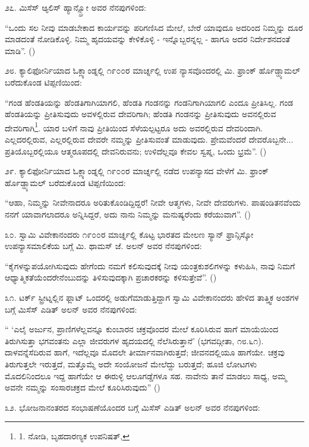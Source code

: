 ೨೭. ಮಿಸೆಸ್ ಆ್ಯಲಿಸ್ ಹ್ಯಾನ್ಸ್ಬ್ರೋ ಅವರ ನೆನಪುಗಳಿಂದ:

“ಒಂದು ಸಲ ನೀವು ಮಾಡಬೇಕಾದ ಕಾರ್ಯವನ್ನು ಪರಿಗಣಿಸಿದ ಮೇಲೆ, ಬೇರೆ ಯಾವುದೂ ಅದರಿಂದ ನಿಮ್ಮನ್ನು ದೂರ ಮಾಡದಂತೆ ನೋಡಿಕೊಳ್ಳಿ. ನಿಮ್ಮ ಹೃದಯವನ್ನು ಕೇಳಿಕೊಳ್ಳಿ - ಇನ್ನೊಬ್ಬರನ್ನಲ್ಲ - ಹಾಗೂ ಅದರ ನಿರ್ದೇಶನದಂತೆ ಮಾಡಿ”. ()

೨೮. ಕ್ಯಾಲಿಫೋರ್ನಿಯಾದ ಓಕ್ಲ್ಯಾಂಡ್ನಲ್ಲಿ ೧೯೦೦ರ ಮಾರ್ಚ್ನಲ್ಲಿ ಉಪ ನ್ಯಾಸವೊಂದರಲ್ಲಿ ಮಿ. ಫ್ರಾಂಕ್ ರ್ಹೊಡ್ಹ್ಯಾಮಲ್ ಬರೆದುಕೊಂಡ ಟಿಪ್ಪಣಿಯಿಂದ:

“ಗಂಡ ಹೆಂಡತಿಯನ್ನು ಹೆಂಡತಿಗಾಗಿಯಾಗಲಿ, ಹೆಂಡತಿ ಗಂಡನನ್ನು ಗಂಡನಿಗಾಗಿಯಾಗಲಿ ಎಂದೂ ಪ್ರೀತಿಸಿಲ್ಲ. ಗಂಡ ಹೆಂಡತಿಯನ್ನು ಪ್ರೀತಿಸುವುದು ಅವಳಲ್ಲಿರುವ ದೇವರಿಗಾಗಿ; ಹೆಂಡತಿ ಗಂಡನನ್ನು ಪ್ರೀತಿಸುವುದು ಅವನಲ್ಲಿರುವ ದೇವರಿಗಾಗಿ\footnote{1. ನೋಡಿ, ಬೃಹದಾರಣ್ಯಕ ಉಪನಿಷತ್, }. ಯಾರ ಬಳಿಗೆ ನಾವು ಪ್ರೀತಿಯಿಂದ ಸೆಳೆಯಲ್ಪಟ್ಟರೂ ಅದು ಅವರಲ್ಲಿರುವ ದೇವರಿಂದಾಗಿ. ಎಲ್ಲದರಲ್ಲಿರುವ, ಎಲ್ಲರಲ್ಲಿರುವ ದೇವರೇ ನಮ್ಮನ್ನು ಪ್ರೀತಿಸುವಂತೆ ಮಾಡುವುದು. ಪ್ರೇಮವೆಂದರೆ ದೇವರೊಬ್ಬನೇ... ಪ್ರತಿಯೊಬ್ಬರಲ್ಲಿಯೂ ಆತ್ಮರೂಪದಲ್ಲಿ ದೇವನಿರುವನು; ಉಳಿದೆಲ್ಲವೂ ಕೇವಲ ಸ್ವಪ್ನ, ಒಂದು ಭ್ರಮೆ”. ()

೨೯. ಕ್ಯಾಲಿಫೋರ್ನಿಯಾದ ಓಕ್ಲ್ಯಾಂಡ್ನಲ್ಲಿ ೧೯೦೦ರ ಮಾರ್ಚ್ನಲ್ಲಿ ನಡೆದ ಉಪನ್ಯಾಸದ ವೇಳೆಗೆ ಮಿ. ಫ್ರಾಂಕ್ ರ್ಹೊಡ್ಹ್ಯಾಮಲ್ ಬರೆದುಕೊಂಡ ಟಿಪ್ಪಣಿಯಿಂದ:

“ಆಹಾ, ನಿಮ್ಮನ್ನು ನೀವೇನಾದರೂ ಅರಿತುಕೊಂಡಿದ್ದಿದ್ದರೆ! ನೀವೇ ಆತ್ಮಗಳು, ನೀವೇ ದೇವರುಗಳು. ಪಾಷಂಡಿತನವೆಂದು ನನಗೆ ಯಾವಾಗಲಾದರೂ ಅನ್ನಿಸಿದ್ದರೆ, ಅದು ನಾನು ನಿಮ್ಮನ್ನು ಮನುಷ್ಯರೆಂದು ಕರೆಯುವಾಗ”. ()

೩೦. ಸ್ವಾಮಿ ವಿವೇಕಾನಂದರು ೧೯೦೦ರ ಮಾರ್ಚ್ನಲ್ಲಿ ಕೊಟ್ಟ ಭಾರತದ ಮೇಲಣ ಸ್ಯಾನ್ ಫ್ರಾನ್ಸಿಸ್ಕೋ ಉಪನ್ಯಾಸಮಾಲಿಕೆಯ ಬಗ್ಗೆ ಮಿ. ಥಾಮಸ್ ಜೆ. ಅಲನ್ ಅವರ ನೆನಪುಗಳಿಂದ:

“ಕೈಗಳನ್ನುಪಯೋಗಿಸುವುದು ಹೇಗೆಂದು ನಮಗೆ ಕಲಿಸುವುದಕ್ಕೆ ನೀವು ಯಂತ್ರಕುಶಲಿಗಳನ್ನು ಕಳುಹಿಸಿ, ನಾವು ನಿಮಗೆ ಆಧ್ಯಾತ್ಮಿಕತೆಯೆಂದರೇನೆಂಬುದನ್ನು ತಿಳಿಸುವುದಕ್ಕಾಗಿ ಪ್ರಚಾರಕರನ್ನು ಕಳಿಸುತ್ತೇವೆ”. ()

೩೧. ಟರ್ಕ್ ಸ್ಟ್ರೀಟ್ನಲ್ಲಿನ ಫ್ಲಾಟ್ ಒಂದರಲ್ಲಿ ಅಡುಗೆಮಾಡುತ್ತಿದ್ದಾಗ ಸ್ವಾಮಿ ವಿವೇಕಾನಂದರು ಹೇಳಿದ ತಾತ್ತ್ವಿಕ ಅಂಶಗಳ ಬಗ್ಗೆ ಮಿಸೆಸ್ ಎಡಿತ್ ಅಲನ್ ಅವರ ನೆನಪುಗಳಿಂದ:

“ ‘ಎಲೈ ಅರ್ಜುನ, ಪ್ರಾಣಿಗಳೆಲ್ಲವನ್ನೂ ಕುಂಬಾರನ ಚಕ್ರವೊಂದರ ಮೇಲೆ ಕೂರಿಸಿರುವ ಹಾಗೆ ಮಾಯೆಯಿಂದ ತಿರುಗಿಸುತ್ತಾ ಭಗವಂತನು ಎಲ್ಲಾ ಜೀವರುಗಳ ಹೃದಯದಲ್ಲಿ ನೆಲೆಸಿರುತ್ತಾನೆ’ (ಭಗವದ್ಗೀತಾ, ೧೮.೬೧). ದಾಳವನ್ನೆಸೆದಿರುವ ಹಾಗೆ, ಇದೆಲ್ಲವೂ ಮೊದಲೇ ತೀರ್ಮಾನವಾಗಿರುತ್ತದೆ; ಜೀವನದಲ್ಲಿಯೂ ಹಾಗೆಯೇ. ಚಕ್ರವು ತಿರುಗುತ್ತಲೇ ಇರುತ್ತದೆ, ಮತ್ತೊಮ್ಮೆ ಅದೇ ಸಂಯೋಜನೆ ಮೇಲೆದ್ದು ಬರುತ್ತದೆ; ಹೂಜಿ ಲೋಟಗಳು ಮೊದಲಿನಿಂದಲೂ ಇದ್ದ ಹಾಗೆಯೇ ಆ ಈರುಳ್ಳಿ ಆಲೂಗಡ್ಡೆಗಳೂ ಸಹ. ನಾವೇನು ತಾನೆ ಮಾಡಲು ಸಾಧ್ಯ, ಅಮ್ಮ ಅವನೇ ನಮ್ಮನ್ನು ಸಂಸಾರಚಕ್ರದ ಮೇಲೆ ಕೂರಿಸಿರುವುದು” ()

೩೨. ಭೋಜನಾನಂತರದ ಸಂಭಾಷಣೆಯೊಂದರ ಬಗ್ಗೆ ಮಿಸೆಸ್ ಎಡಿತ್ ಅಲನ್ ಅವರ ನೆನಪುಗಳಿಂದ:

